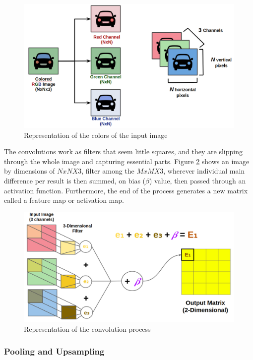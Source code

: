 \begin{figure}[H]
\centering
\includegraphics[scale=0.35]{imagens/rgb_representation.png}
\caption{Representation of the colors of the input image \cite{lecture}}
\label{fig:rgb}
\end{figure}


The convolutions work as filters that seem little squares, and they are slipping through the whole image and capturing essential parts.  Figure \ref{fig:bias} shows an image by dimensions of $NxNX3$, filter among the $MxMX3$, wherever individual main difference per result is then summed, on bias ($\beta$) value, then passed through an activation function. Furthermore, the end of the process generates a new matrix called a feature map or activation map.


\begin{figure}[H]
\centering
\includegraphics[scale=0.35]{imagens/three_dim_conv_2.png}
\caption{Representation of the convolution process \cite{lecture}}
\label{fig:bias}
\end{figure}




\subsubsection{Pooling and Upsampling}\label{sub:pooling}

